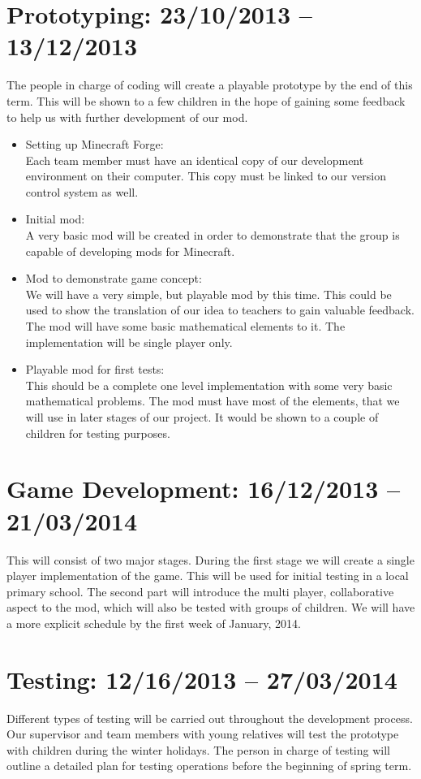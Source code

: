 \section{Prototyping: 23/10/2013 -- 13/12/2013}
The people in charge of coding will create a playable prototype by the end of this term. This will be shown to a few children in the hope of gaining some feedback to help us with further development of our mod.
\begin{itemize}
\item{Setting up Minecraft Forge:\\Each team member must have an identical copy of our development environment on their computer. This copy must be linked to our version control system as well.}

\item{Initial mod:\\A very basic mod will be created in order to demonstrate that the group is capable of developing mods for Minecraft.}

\item{Mod to demonstrate game concept:\\We will have a very simple, but playable mod by this time. This could be used to show the translation of our idea to teachers to gain valuable feedback. The mod will have some basic mathematical elements to it. The implementation will be single player only.}
\item{Playable mod for first tests:\\This should be a complete one level implementation with some very basic mathematical problems. The mod must have most of the elements, that we will use in later stages of our project. It would be shown to a couple of children for testing purposes.}
\end{itemize}

\section{Game Development: 16/12/2013 -- 21/03/2014}
This will consist of two major stages. During the first stage we will create a single player implementation of the game. This will be used for initial testing in a local primary school. The second part will introduce the multi player, collaborative aspect to the mod, which will also be tested with groups of children. We will have a more explicit schedule by the first week of January, 2014.

\section{Testing: 12/16/2013 -- 27/03/2014}
Different types of testing will be carried out throughout the development process. Our supervisor and team members with young relatives will test the prototype with children during the winter holidays. The person in charge of testing will outline a detailed plan for testing operations before the beginning of spring term.

